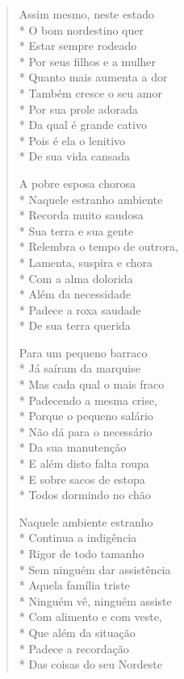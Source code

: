 \begin{verse}
Assim mesmo, neste estado\\*
O bom nordestino quer\\*
Estar sempre rodeado\\*
Por seus filhos e a mulher\\*
Quanto mais aumenta a dor\\*
Também cresce o seu amor\\*
Por sua prole adorada\\*
Da qual é grande cativo\\*
Pois é ela o lenitivo\\*
De sua vida cansada

A pobre esposa chorosa\\*
Naquele estranho ambiente\\*
Recorda muito saudosa\\*
Sua terra e sua gente\\*
Relembra o tempo de outrora,\\*
Lamenta, suspira e chora\\*
Com a alma dolorida\\*
Além da necessidade\\*
Padece a roxa saudade\\*
De sua terra querida

Para um pequeno barraco\\*
Já saíram da marquise\\*
Mas cada qual o mais fraco\\*
Padecendo a mesma crise,\\*
Porque o pequeno salário\\*
Não dá para o necessário\\*
Da sua manutenção\\*
E além disto falta roupa\\*
E sobre sacos de estopa\\*
Todos dormindo no chão

Naquele ambiente estranho\\*
Continua a indigência\\*
Rigor de todo tamanho\\*
Sem ninguém dar assistência\\*
Aquela família triste\\*
Ninguém vê, ninguém assiste\\*
Com alimento e com veste,\\*
Que além da situação\\*
Padece a recordação\\*
Das coisas do seu Nordeste


\end{verse}
